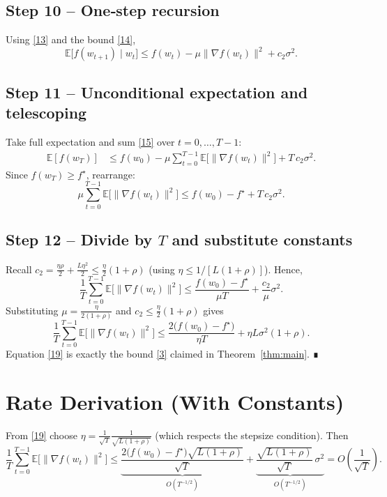\documentclass{article}
\begin{document}
\subsection*{Step 10 – One‑step recursion}
Using \eqref{13} and the bound \eqref{14},
\[
\mathbb{E}\big[f(w_{t+1})\mid w_t\big]
\le f(w_t)-\mu\|\nabla f(w_t)\|^{2}+c_2\sigma^{2}.
\tag{15}
\]

\subsection*{Step 11 – Unconditional expectation and telescoping}
Take full expectation and sum \eqref{15} over $t=0,\dots,T-1$:
\[
\begin{aligned}
\mathbb{E}[f(w_T)]
&\le f(w_0)-\mu\sum_{t=0}^{T-1}\mathbb{E}\big[\|\nabla f(w_t)\|^{2}\big]
+T\,c_2\sigma^{2}.
\end{aligned}
\tag{16}
\]
Since $f(w_T)\ge f^\star$, rearrange:
\[
\mu\sum_{t=0}^{T-1}\mathbb{E}\big[\|\nabla f(w_t)\|^{2}\big]
\le f(w_0)-f^\star+T\,c_2\sigma^{2}.
\tag{17}
\]

\subsection*{Step 12 – Divide by $T$ and substitute constants}
Recall $c_2=\frac{\eta\rho}{2}+\frac{L\eta^{2}}{2}\le\frac{\eta}{2}(1+\rho)$ (using $\eta\le1/[L(1+\rho)]$). Hence,
\[
\frac{1}{T}\sum_{t=0}^{T-1}\mathbb{E}\big[\|\nabla f(w_t)\|^{2}\big]
\le \frac{f(w_0)-f^\star}{\mu T}
     +\frac{c_2}{\mu}\sigma^{2}.
\tag{18}
\]
Substituting $\mu=\frac{\eta}{2(1+\rho)}$ and $c_2\le\frac{\eta}{2}(1+\rho)$ gives
\[
\frac{1}{T}\sum_{t=0}^{T-1}\mathbb{E}\big[\|\nabla f(w_t)\|^{2}\big]
\le \frac{2\big(f(w_0)-f^\star\big)}{\eta T}
   +\eta L\sigma^{2}(1+\rho) .
\tag{19}
\]
Equation \eqref{19} is exactly the bound \eqref{3} claimed in Theorem~\ref{thm:main}. ∎

\section*{Rate Derivation (With Constants)}
From \eqref{19} choose $\eta = \frac{1}{\sqrt{T}}\frac{1}{\sqrt{L(1+\rho)}}$ (which respects the stepsize condition). Then
\[
\frac{1}{T}\sum_{t=0}^{T-1}\mathbb{E}\big[\|\nabla f(w_t)\|^{2}\big]
\le
\underbrace{\frac{2\big(f(w_0)-f^\star\big)\sqrt{L(1+\rho)}}{\sqrt{T}}}_{O(T^{-1/2})}
+
\underbrace{\frac{\sqrt{L(1+\rho)}}{\sqrt{T}}\,\sigma^{2}}_{O(T^{-1/2})}
=O\!\left(\frac{1}{\sqrt{T}}\right).
\]
\end{document}
